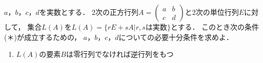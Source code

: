 \documentclass[../../main.tex]{subfiles}
\begin{document}
$a$，$b$，$c$，$d$を実数とする．
2次の正方行列$A=
\begin{pmatrix} a & b \\ c & d
\end{pmatrix}$と2次の単位行列$E$に対して，
集合$L(A)$を$L(A)= \{ rE+sA | r,s\text{は実数} \}$とする．
このとき次の条件(＊)が成立するための，
$a$，$b$，$c$，$d$についての必要十分条件を求めよ．
\begin{enumerate}
  \item[(＊)]$L(A)$の要素$B$は零行列でなければ逆行列をもつ
\end{enumerate}
\end{document}
